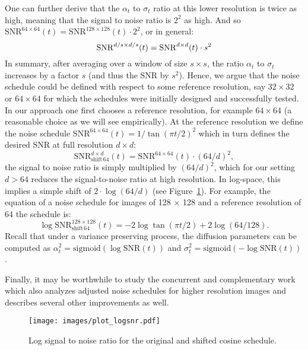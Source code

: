 One can further derive that the $\alpha_t$ to $\sigma_t$ ratio at this lower resolution is twice as high, meaning that the signal to noise ratio is $2^2$ as high. And so $\mathrm{SNR}^{64 \times 64}(t) = \mathrm{SNR}^{128\times 128}(t) \cdot 2^2$, or in general:
\begin{equation}\small
    \mathrm{SNR}^{d / s \times d / s}(t) = \mathrm{SNR}^{d \times d}(t) \cdot s^2
\end{equation}
In summary, after averaging over a window of size $s \times s$, the ratio $\alpha_t$ to $\sigma_t$ increases by a factor $s$ (and thus the $\mathrm{SNR}$ by $s^2$). Hence, we argue that the noise schedule could be defined with respect to some reference resolution, say $32 \times 32$ or $64 \times 64$ for which the schedules were initially designed and successfully tested. 
In our approach one first chooses a reference resolution, for example $64 \times 64$ (a reasonable choice as we will see empirically). At the reference resolution we define the noise schedule $\mathrm{SNR}^{64 \times 64}(t) = 1 / \tan(\pi t / 2)^2$ which in turn defines the desired $\mathrm{SNR}$ at full resolution $d \times d$:
\begin{equation}
    \mathrm{SNR}_{\mathrm{shift}\, 64}^{d \times d}(t) = \mathrm{SNR}^{64 \times 64}(t) \cdot (64 / d)^2,
\end{equation}
the signal to noise ratio is simply multiplied by $(64 / d)^2$, which for our setting $d > 64$ reduces the signal-to-noise ratio at high resolution. In log-space, this implies a simple shift of $2 \cdot \log (64 / d)$ (see Figure~\ref{fig:diffusion_shifted_snr}). For example, the equation of a noise schedule for images of 128 $\times$ 128 and a reference resolution of 64 the schedule is:
\begin{equation*}
    \log \mathrm{SNR}_{\mathrm{shift} \, 64}^{128 \times 128}(t) = - 2 \log \tan (\pi t / 2) + 2 \log (64 / 128).
\end{equation*}
Recall that under a variance preserving process, the diffusion parameters can be computed as $\alpha^2_t = \mathrm{sigmoid}(\log \mathrm{SNR}(t))$ and $\sigma^2_t = \mathrm{sigmoid}(-\log \mathrm{SNR}(t))$.

Finally, it may be worthwhile to study the concurrent and complementary work \citep{chen2023importancenoise} which also analyzes adjusted noise schedules for higher resolution images and describes several other improvements as well.

\begin{figure}
    \centering
    \texttt{[image: images/plot\_logsnr.pdf]}\vspace{-.1cm}
    \caption{Log signal to noise ratio for the original and shifted cosine schedule.}
    \label{fig:diffusion_shifted_snr}
    \vspace{-.35cm}
\end{figure}

